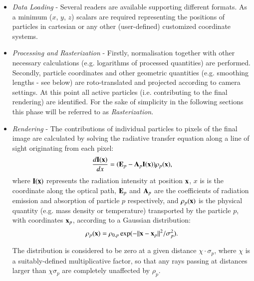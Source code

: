 \documentclass[1p]{elsarticle}
\begin{document}
\begin{itemize}
\item
{\it Data Loading} - Several readers are available supporting different formats. As a minimum ($x$, $y$, $z$) scalars are required representing the positions of particles in cartesian or any other (user-defined) customized coordinate systems.
\item
{\it Processing and Rasterization} - Firstly, normalisation together with other necessary 
calculations (e.g. logarithms of processed quantities) are performed. Secondly, particle 
coordinates and other geometric quantities (e.g. smoothing lengths - see below) are 
roto-translated and projected according to camera settings. 
At this point all active 
particles (i.e. contributing to the final rendering) are identified.
For the sake of simplicity in the following sections 
this phase will be referred to as {\it Rasterization}.
\item
{\it Rendering} - The contributions of individual particles to pixels of the final 
image are calculated by solving the radiative transfer equation  \cite{1991par..book.....S} along a line of sight originating from each pixel:
\begin{equation}\label{rad}
\frac{d{\bf I}{(\bf x})}{dx}=({\bf E}_p-{\bf A}_p{\bf I}({\bf x}))\rho_p({\bf x}),
\end{equation}
where ${\bf I}({\bf x})$ represents the radiation intensity at position ${\bf x}$, $x$ is is the coordinate along the optical path,  ${\bf E}_p$ and ${\bf A}_p$ are the coefficients of radiation emission and absorption of particle $p$ respectively, and $\rho_p({\bf x})$ is the physical quantity (e.g. mass density or temperature) transported by the particle $p$, with coordinates ${\bf x}_p$, according to a Gaussian distribution:
\begin{equation}\label{kernel}
\rho_p({\bf x}) = \rho_{0,p}\exp(-{||{\bf x}-{\bf x}_p||}^2/\sigma_p^2).
\end{equation}
 
The distribution is considered to be zero at a given distance $\chi\cdot\sigma_p$, where $\chi$ is a suitably-defined multiplicative factor, so that any rays passing at distances larger than $\chi\sigma_p$ are completely unaffected by $\rho_p$.


\end{itemize}
\end{document}
